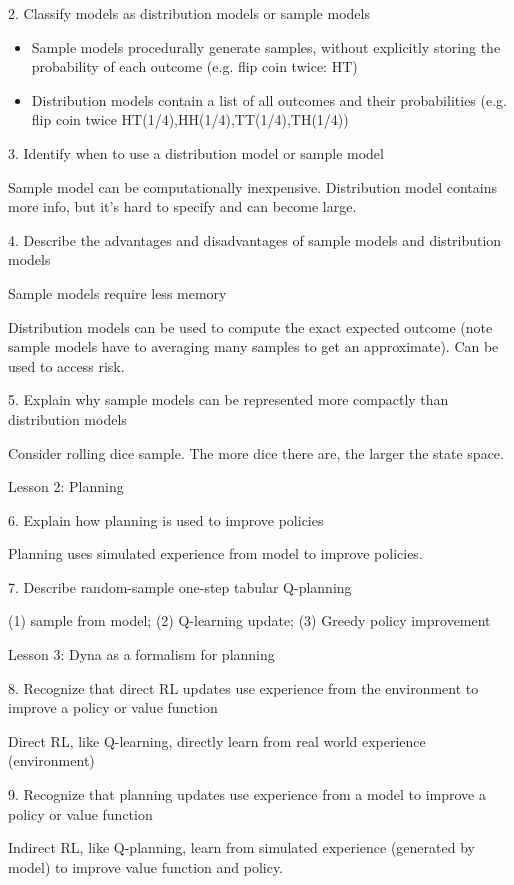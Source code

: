 \documentclass[sutton_barto_notes.tex]{subfiles}
\begin{document}
2. Classify models as distribution models or sample models 

\begin{itemize}
\item Sample models procedurally generate samples, without explicitly storing the probability of each outcome (e.g. flip coin twice: HT)
\item Distribution models contain a list of all outcomes and their probabilities (e.g. flip coin twice HT(1/4),HH(1/4),TT(1/4),TH(1/4))
\end{itemize}

3. Identify when to use a distribution model or sample model 

Sample model can be computationally inexpensive. Distribution model contains more info, but it's hard to specify and can become large.

4. Describe the advantages and disadvantages of sample models and distribution models 

Sample models require less memory

Distribution models can be used to compute the exact expected outcome (note sample models have to averaging many samples to get an approximate). Can be used to access risk.

5. Explain why sample models can be represented more compactly than distribution models

Consider rolling dice sample. The more dice there are, the larger the state space.

Lesson 2: Planning 

6. Explain how planning is used to improve policies 

Planning uses simulated experience from model to improve policies.

7. Describe random-sample one-step tabular Q-planning 

(1) sample from model; (2) Q-learning update; (3) Greedy policy improvement

Lesson 3: Dyna as a formalism for planning 

8. Recognize that direct RL updates use experience from the environment to improve a policy or value function 

Direct RL, like Q-learning, directly learn from real world experience (environment)

9. Recognize that planning updates use experience from a model to improve a policy or value function 

Indirect RL, like Q-planning, learn from simulated experience (generated by model) to improve value function and policy.
\end{document}
